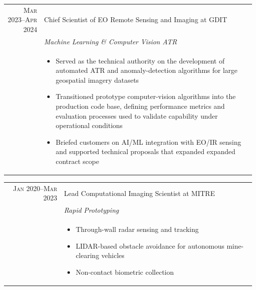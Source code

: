 \documentclass[letterpaper,12pt]{article}
\begin{document}
\begin{tabular}{rp{13cm}}
	\textsc{Mar 2023}--\textsc{Apr 2024} & Chief Scientist of EO Remote Sensing and Imaging at \textsc{GDIT}  \\  
	& \emph{Machine Learning \& Computer Vision ATR} \\   
	& \footnotesize{ 
		\begin{itemize}[topsep=0pt,itemsep=0pt,partopsep=0pt,parsep=0pt]
			\vspace{-0.2cm}
			\item Served as the technical authority on the development of automated ATR and anomaly-detection algorithms for large geospatial imagery datasets
			\item Transitioned prototype computer-vision algorithms into the production code base, defining performance metrics and evaluation processes used to validate capability under operational conditions
			\item Briefed customers on AI/ML integration with EO/IR sensing and supported technical proposals that expanded expanded contract scope
	\end{itemize}}\\
\end{tabular}

\begin{tabular}{rp{13cm}}
	\textsc{Jan 2020}--\textsc{Mar 2023} & Lead Computational Imaging Scientist at \textsc{MITRE}  \\  
	& \emph{Rapid Prototyping} \\   
	& \footnotesize{ 
	\begin{itemize}[topsep=0pt,itemsep=0pt,partopsep=0pt,parsep=0pt]
		\vspace{-0.2cm}
		\item Through-wall radar sensing and tracking
		\item LIDAR-based obstacle avoidance for autonomous mine-clearing vehicles
		\item Non-contact biometric collection
	\end{itemize}}\\
\end{tabular}
\end{document}
